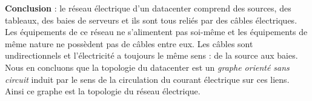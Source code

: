 
{\bf Conclusion} : 
le r\'eseau \'electrique d'un datacenter comprend des sources, des tableaux, des baies de serveurs et  ils sont tous reli\'es  par des c\^ables \'electriques. Les \'equipements de ce r\'eseau ne s'alimentent pas soi-m\^eme et les \'equipements de m\^eme nature ne poss\`edent pas de c\^ables entre eux. Les c\^ables sont undirectionnels et l'\'electricit\'e a toujours le m\^eme sens : de la source aux baies.
Nous en concluons que la topologie du datacenter est un {\em graphe orient\'e sans circuit} induit par le sens de la circulation du courant \'electrique sur ces liens. Ainsi ce graphe est la topologie du r\'eseau \'electrique. 
